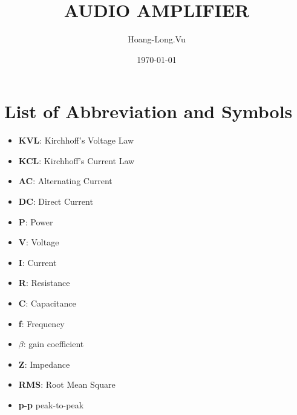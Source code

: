 \documentclass[twoside, a4paper, leqno]{article}
\author{Hoang-Long.Vu}
\date{\today}
\title{AUDIO AMPLIFIER}
\begin{document}
	
	\maketitle
	
	\newpage
	\section*{ \textbf{List of Abbreviation and Symbols}}
	\begin{itemize}
		\item \textbf{KVL}: Kirchhoff's Voltage Law
		\item \textbf{KCL}: Kirchhoff's Current Law
		\item \textbf{AC}: Alternating Current
		\item \textbf{DC}: Direct Current
		\item \textbf{P}: Power
		\item \textbf{V}: Voltage
		\item \textbf{I}: Current
		\item \textbf{R}: Resistance
		\item \textbf{C}: Capacitance
		\item \textbf{f}: Frequency
		\item \textbf{$\beta$}: gain coefficient
		\item \textbf{Z}: Impedance
		\item \textbf{RMS}: Root Mean Square
		\item \textbf{p-p} peak-to-peak
		
	\end{itemize}
		
\end{document}
